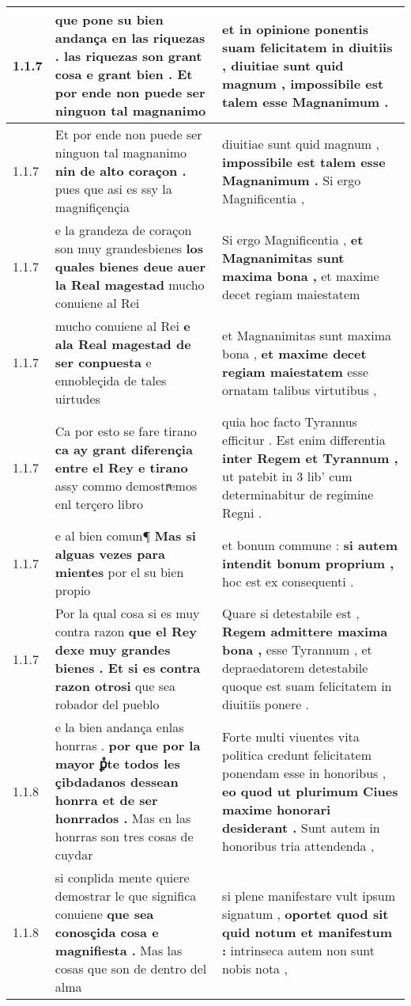 \begin{tabular}{|p{1cm}|p{6.5cm}|p{6.5cm}|}
1.1.7 & que pone su bien andança en las riquezas . \textbf{ las riquezas son grant cosa e grant bien . } Et por ende non puede ser ninguon tal magnanimo & et in opinione ponentis suam felicitatem in diuitiis , \textbf{ diuitiae sunt quid magnum , } impossibile est talem esse Magnanimum . \\\hline
1.1.7 & Et por ende non puede ser ninguon tal magnanimo \textbf{ nin de alto coraçon . } pues que asi es ssy la magnifiçençia & diuitiae sunt quid magnum , \textbf{ impossibile est talem esse Magnanimum . } Si ergo Magnificentia , \\\hline
1.1.7 & e la grandeza de coraçon son muy grandesbienes \textbf{ los quales bienes deue auer la Real magestad } mucho conuiene al Rei & Si ergo Magnificentia , \textbf{ et Magnanimitas sunt maxima bona , } et maxime decet regiam maiestatem \\\hline
1.1.7 & mucho conuiene al Rei \textbf{ e ala Real magestad de ser conpuesta } e ennobleçida de tales uirtudes & et Magnanimitas sunt maxima bona , \textbf{ et maxime decet regiam maiestatem } esse ornatam talibus virtutibus , \\\hline
1.1.7 & Ca por esto se fare tirano \textbf{ ca ay grant diferençia entre el Rey e tirano } assy commo demostrͣemos enl terçero libro & quia hoc facto Tyrannus efficitur . Est enim differentia \textbf{ inter Regem et Tyrannum , } ut patebit in 3 lib’ cum determinabitur de regimine Regni . \\\hline
1.1.7 & e al bien comun¶ \textbf{ Mas si alguas vezes para mientes } por el su bien propio & et bonum commune : \textbf{ si autem intendit bonum proprium , } hoc est ex consequenti . \\\hline
1.1.7 & Por la qual cosa si es muy contra razon \textbf{ que el Rey dexe muy grandes bienes . Et si es contra razon otrosi } que sea robador del pueblo & Quare si detestabile est , \textbf{ Regem admittere maxima bona , } esse Tyrannum , et depraedatorem detestabile quoque est suam felicitatem in diuitiis ponere . \\\hline
1.1.8 & e la bien andança enlas honrras . \textbf{ por que por la mayor ꝑͣte todos les çibdadanos dessean honrra et de ser honrrados . } Mas en las honrras son tres cosas de cuydar & Forte multi viuentes vita politica credunt felicitatem ponendam esse in honoribus , \textbf{ eo quod ut plurimum Ciues maxime honorari desiderant . } Sunt autem in honoribus tria attendenda , \\\hline
1.1.8 & si conplida mente quiere demostrar le que significa conuiene \textbf{ que sea conosçida cosa e magnifiesta . } Mas las cosas que son de dentro del alma & si plene manifestare vult ipsum signatum , \textbf{ oportet quod sit quid notum et manifestum : } intrinseca autem non sunt nobis nota , \\\hline

\end{tabular}
